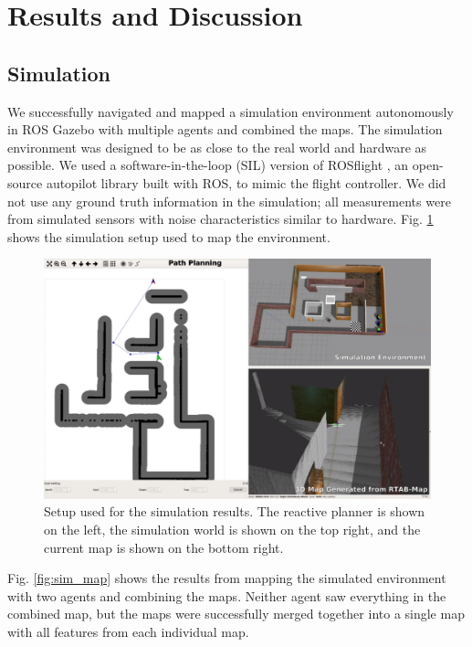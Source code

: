 \documentclass[letterpaper, 10 pt, conference]{ieeeconf}  %
\begin{document}
\section{Results and Discussion}\label{results}

\subsection{Simulation}

We successfully navigated and mapped a simulation environment autonomously in ROS Gazebo \cite{Gazebo} with multiple agents and combined the maps. The simulation environment was designed to be as close to the real world and hardware as possible. We used a software-in-the-loop (SIL) version of ROSflight \cite{Jackson2016a}, an open-source autopilot library built with ROS, to mimic the flight controller. We did not use any ground truth information in the simulation; all measurements were from simulated sensors with noise characteristics similar to hardware. Fig. \ref{fig:sim_setup} shows the simulation setup used to map the environment.

\begin{figure}
\centering
\includegraphics[width=1.0\linewidth]{sim_setup}
\caption{Setup used for the simulation results. The reactive planner is shown on the left, the simulation world is shown on the top right, and the current map is shown on the bottom right.}
\label{fig:sim_setup}
\end{figure}

Fig. \ref{fig:sim_map} shows the results from mapping the simulated environment with two agents and combining the maps. Neither agent saw everything in the combined map, but the maps were successfully merged together into a single map with all features from each individual map.
\end{document}
